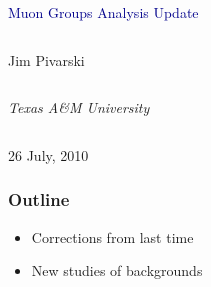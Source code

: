 \documentclass[compress]{beamer}
\begin{document}
\begin{frame}
\vfill
\begin{center}
\textcolor{darkblue}{\Large Muon Groups Analysis Update}

\vfill
\begin{columns}
\begin{center}
\large
Jim Pivarski
\end{center}
\end{columns}

\begin{columns}
\begin{center}
\scriptsize
{\it Texas A\&M University}
\end{center}
\end{columns}

\vfill
26 July, 2010

\end{center}
\end{frame}


\small

\begin{frame}
\frametitle{Outline}
\begin{itemize}
\item Corrections from last time
\item New studies of backgrounds
\end{itemize}
\end{frame}
\end{document}
